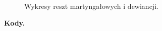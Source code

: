 \documentclass[]{article}
\begin{document}
\begin{figure}[hbt!]
\begin{center}
  \end{center}
  \vspace{-20pt}
  \label{fig:sc}
  \caption{Wykresy reszt martyngałowych i dewiancji.}

\end{figure}

\newpage
\textbf{Kody.} \newline
\end{document}

